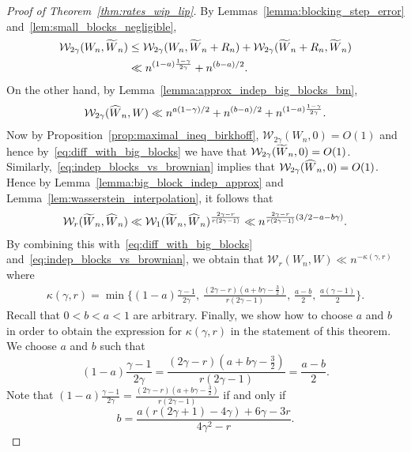 \documentclass[10pt,a4paper]{amsart}
\newcommand{\shat}[1]{\vphantom{#1}\smash[t]{\widehat{#1}}}
\newcommand{\stilde}[1]{\vphantom{#1}\smash[t]{\widetilde{#1}}}
\newcommand{\wass}{\mathcal{W}}
\begin{document}
\begin{proof}[Proof of Theorem~\ref{thm:rates_wip_lip}]
	By Lemmas~\ref{lemma:blocking_step_error} and~\ref{lem:small_blocks_negligible},
	\begin{align}
		\wass_{2\gamma}(W_n,\stilde W_n)&\le \wass_{2\gamma}(W_n, \stilde W_n+R_n)+\wass_{2\gamma}(\stilde W_n+R_n, \stilde W_n)\nonumber\\
		&\ll n^{(1-a)\frac{1-\gamma}{2\gamma}}+n^{(b-a)/2}.\label{eq:diff_with_big_blocks}
	\end{align}
	On the other hand, by Lemma~\ref{lemma:approx_indep_big_blocks_bm},
	\begin{align}
		\wass_{2\gamma}(\shat W_n,W)\ll n^{a(1-\gamma)/2}+ n^{(b-a)/2}+n^{(1-a)\frac{1-\gamma}{2\gamma}}.\label{eq:indep_blocks_vs_brownian}
	\end{align}
	Now by Proposition~\ref{prop:maximal_ineq_birkhoff}, $\wass_{2\gamma}(W_n,0)=O(1)$ and hence by~\eqref{eq:diff_with_big_blocks} we have that $\wass_{2\gamma}(\stilde W_n, 0)=O(1)$. Similarly,~\eqref{eq:indep_blocks_vs_brownian} implies that $\wass_{2\gamma}(\shat W_n, 0)=O(1)$. Hence by Lemma~\ref{lemma:big_block_indep_approx} and Lemma~\ref{lem:wasserstein_interpolation}, it follows that 
	\begin{align*}
		\wass_r(\stilde W_n, \shat W_n)\ll \wass_1(\stilde W_n, \shat W_n)^\frac{2\gamma-r}{r(2\gamma-1)}\ll n^{\frac{2\gamma-r}{r(2\gamma-1)}(3/2-a-b\gamma)}.
	\end{align*}
	By combining this with~\eqref{eq:diff_with_big_blocks} and~\eqref{eq:indep_blocks_vs_brownian}, we obtain that $ \wass_r(W_n, W)\ll n^{-\kappa(\gamma,r)} $ where
	\begin{align}
		\kappa(\gamma,r)=\min\Big\{(1-a)\frac{\gamma-1}{2\gamma},\, \frac{(2\gamma-r)(a+b\gamma-\frac{3}{2})}{r(2\gamma-1)},\, \frac{a-b}{2},\, \frac{a(\gamma-1)}{2}\Big\}.\label{eq:wip_implicit_Wp_bd}
	\end{align}
	Recall that $ 0<b<a<1 $ are arbitrary. Finally, we show how to choose $ a $ and $ b $ in order to obtain the expression for $ \kappa(\gamma,r) $ in the statement of this theorem. We choose $a$ and $b$ such that 
	\[ (1-a)\frac{\gamma-1}{2\gamma}=\frac{(2\gamma-r)(a+b\gamma-\frac{3}{2})}{r(2\gamma-1)}=\frac{a-b}{2}. \]
	Note that $ (1-a)\frac{\gamma-1}{2\gamma}=\frac{(2\gamma-r)(a+b\gamma-\frac{3}{2})}{r(2\gamma-1)}$ if and only if
	\begin{equation}\label{eq:b_eq_1}
		b = \frac{a(r(2\gamma+1)-4\gamma)+6\gamma-3r}{4\gamma^2-r}.
	\end{equation}

\end{proof}
\end{document}
